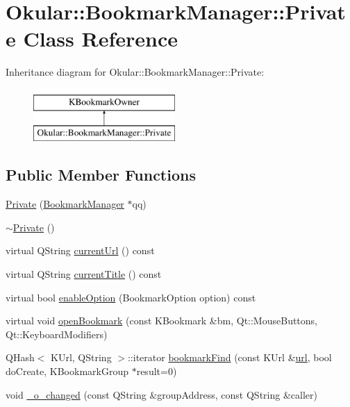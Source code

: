 \hypertarget{classBookmarkManager_1_1Private}{\section{Okular\+:\+:Bookmark\+Manager\+:\+:Private Class Reference}
\label{classBookmarkManager_1_1Private}
}
Inheritance diagram for Okular\+:\+:Bookmark\+Manager\+:\+:Private\+:\begin{figure}[H]
\begin{center}
\leavevmode
\includegraphics[height=2.000000cm]{classBookmarkManager_1_1Private}
\end{center}
\end{figure}
\subsection*{Public Member Functions}
\begin{DoxyCompactItemize}
\item 
\hyperlink{classBookmarkManager_1_1Private_af96bac7307a75b78d1f7b2b4b727d1c9}{Private} (\hyperlink{classOkular_1_1BookmarkManager}{Bookmark\+Manager} $\ast$qq)
\item 
\hyperlink{classBookmarkManager_1_1Private_a2e89b9fcb39b5ede9957e464f3e40e00}{$\sim$\+Private} ()
\item 
virtual Q\+String \hyperlink{classBookmarkManager_1_1Private_a9d8a29de51d3cbdd0ffe2bcca282aa33}{current\+Url} () const 
\item 
virtual Q\+String \hyperlink{classBookmarkManager_1_1Private_a5a2c0e82699076f1277174f11d4da435}{current\+Title} () const 
\item 
virtual bool \hyperlink{classBookmarkManager_1_1Private_aae70c0e4e227fb4c3c447d5557463b5f}{enable\+Option} (Bookmark\+Option option) const 
\item 
virtual void \hyperlink{classBookmarkManager_1_1Private_a5826a4c88f1e43102574f90ce5d8a06e}{open\+Bookmark} (const K\+Bookmark \&bm, Qt\+::\+Mouse\+Buttons, Qt\+::\+Keyboard\+Modifiers)
\item 
Q\+Hash$<$ K\+Url, Q\+String $>$\+::iterator \hyperlink{classBookmarkManager_1_1Private_ae01a437da3410e1459293530bae155de}{bookmark\+Find} (const K\+Url \&\hyperlink{classBookmarkManager_1_1Private_a76891cf0a4b6713612876ee2eceee94d}{url}, bool do\+Create, K\+Bookmark\+Group $\ast$result=0)
\item 
void \hyperlink{classBookmarkManager_1_1Private_a6e4c4ee95b1ea582207648a499e6f285}{\+\_\+o\+\_\+changed} (const Q\+String \&group\+Address, const Q\+String \&caller)
\end{DoxyCompactItemize}

